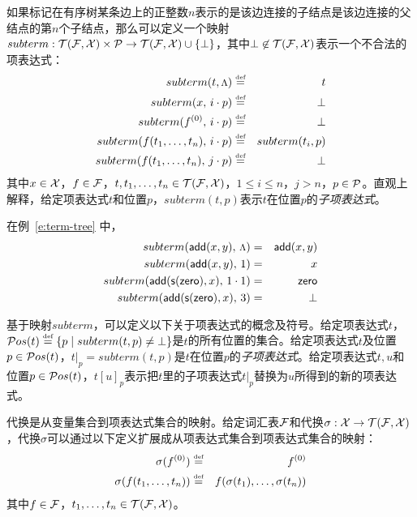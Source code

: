 如果标记在有序树某条边上的正整数$n$表示的是该边连接的子结点是该边连接的父结点的第$n$个子结点，那么可以定义一个映射$subterm : \TFX \times \cP \ra \TFX\cup\{\bot\}$，其中$\bot\not\in\TFX$表示一个不合法的项表达式：
\begin{eqnarray}
  subterm(t, \rootp) & \defeq & t  \nonumber \\
  subterm(x,\, i\cdot p) & \defeq & \bot  \nonumber \\
  subterm(f^{(0)},\, i\cdot p) & \defeq & \bot  \nonumber \\
  subterm(f(t_1,\ldots,t_n),\, i\cdot p) & \defeq & subterm(t_i, p) \nonumber \\
  subterm(f(t_1,\ldots,t_n),\, j\cdot p) & \defeq & \bot \nonumber
\end{eqnarray}
其中$x\in\cX$，$f\in\cF$，$t,t_1,\ldots,t_n\in\TFX$，$1\le i\le n$，$j > n$，$p\in\cP$。直观上解释，给定项表达式$t$和位置$p$，$subterm(t,p)$表示$t$在位置$p$的\emph{子项表达式}。

\begin{example}
在例~\ref{e:term-tree} 中，
\begin{eqnarray}
  subterm(\add(x,y),\, \rootp) & = & \add(x,y)  \nonumber \\
  subterm(\add(x,y),\, 1) & = & x \nonumber \\
  subterm(\add(\s(\zero),x),\, 1\cdot 1) & = & \zero  \nonumber \\
  subterm(\add(\s(\zero),x),\, 3) & = & \bot  \nonumber
\end{eqnarray}
\end{example}

基于映射$subterm$，可以定义以下关于项表达式的概念及符号。给定项表达式$t$，$\Pos{t}\defeq \{p\mid subterm(t,p)\not=\bot\}$是$t$的所有位置的集合。给定项表达式$t$及位置$p \in \Pos{t}$，$t|_p = subterm(t,p)$是$t$在位置$p$的\emph{子项表达式}。给定项表达式$t,u$和位置$p\in\Pos{t}$，$t[u]_p$表示把$t$里的子项表达式$t|_p$替换为$u$所得到的新的项表达式。

\begin{definition}[代换]
代换是从变量集合到项表达式集合的映射。给定词汇表$\cF$和代换$\sigma : \cX \ra \TFX$，代换$\sigma$可以通过以下定义扩展成从项表达式集合到项表达式集合的映射：
\begin{eqnarray}
  \sigma(f^{(0)}) & \defeq & f^{(0)}  \nonumber \\
  \sigma(f(t_1,\ldots,t_n)) & \defeq & f(\sigma(t_1),\ldots,\sigma(t_n)) \nonumber
\end{eqnarray}
其中$f\in\cF$，$t_1,\ldots,t_n\in\TFX$。
\end{definition}

